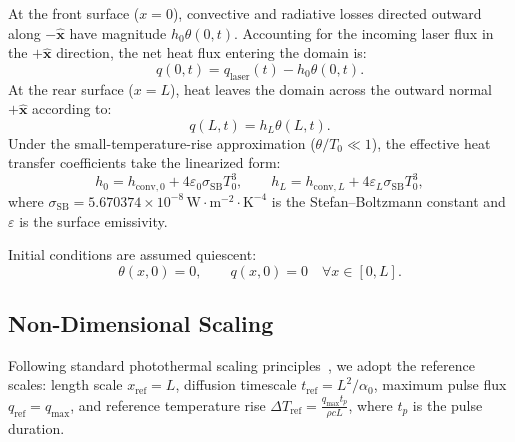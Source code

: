 \documentclass[preprint,12pt]{elsarticle}
\begin{document}
At the front surface ($x = 0$), convective and radiative losses directed outward along $-\hat{\bm{x}}$ have magnitude $h_0 \theta(0, t)$. Accounting for the incoming laser flux in the $+\hat{\bm{x}}$ direction, the net heat flux entering the domain is:
\begin{equation}
q(0, t) = q_{\mathrm{laser}}(t) - h_0 \theta(0, t). \label{eq:bc_front}
\end{equation}
At the rear surface ($x = L$), heat leaves the domain across the outward normal $+\hat{\bm{x}}$ according to:
\begin{equation}
q(L, t) = h_L \theta(L, t). \label{eq:bc_rear}
\end{equation}
Under the small-temperature-rise approximation ($\theta / T_0 \ll 1$), the effective heat transfer coefficients take the linearized form:
\begin{equation}
h_0 = h_{\mathrm{conv}, 0} + 4 \varepsilon_0 \sigma_{\mathrm{SB}} T_0^3, \qquad h_L = h_{\mathrm{conv}, L} + 4 \varepsilon_L \sigma_{\mathrm{SB}} T_0^3,
\label{eq:h_eff_def}
\end{equation}
where $\sigma_{\mathrm{SB}} = 5.670374 \times 10^{-8} \, \mathrm{W \cdot m^{-2} \cdot K^{-4}}$ is the Stefan--Boltzmann constant and $\varepsilon$ is the surface emissivity.

Initial conditions are assumed quiescent:
\begin{equation}
\theta(x, 0) = 0, \qquad q(x, 0) = 0 \quad \forall x \in [0, L]. \label{eq:ic}
\end{equation}

\subsection{Non-Dimensional Scaling}

Following standard photothermal scaling principles~\cite{baba2001improvement,li2020appropriate}, we adopt the reference scales: length scale $x_{\mathrm{ref}} = L$, diffusion timescale $t_{\mathrm{ref}} = L^2 / \alpha_0$, maximum pulse flux $q_{\mathrm{ref}} = q_{\max}$, and reference temperature rise $\Delta T_{\mathrm{ref}} = \frac{q_{\max} t_p}{\rho c L}$, where $t_p$ is the pulse duration.
\end{document}
